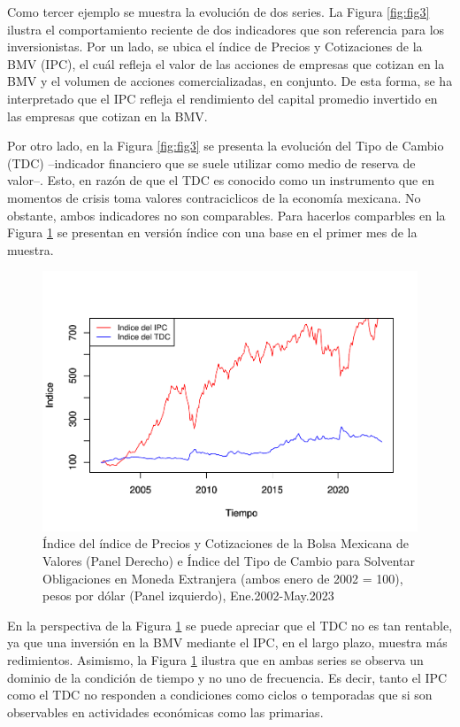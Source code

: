\documentclass[
]{book}
\begin{document}
Como tercer ejemplo se muestra la evolución de dos series. La Figura \ref{fig:fig3} ilustra el comportamiento reciente de dos indicadores que son referencia para los inversionistas. Por un lado, se ubica el índice de Precios y Cotizaciones de la BMV (IPC), el cuál refleja el valor de las acciones de empresas que cotizan en la BMV y el volumen de acciones comercializadas, en conjunto. De esta forma, se ha interpretado que el IPC refleja el rendimiento del capital promedio invertido en las empresas que cotizan en la BMV.

Por otro lado, en la Figura \ref{fig:fig3} se presenta la evolución del Tipo de Cambio (TDC) --indicador financiero que se suele utilizar como medio de reserva de valor--. Esto, en razón de que el TDC es conocido como un instrumento que en momentos de crisis toma valores contraciclicos de la economía mexicana. No obstante, ambos indicadores no son comparables. Para hacerlos comparbles en la Figura \ref{fig:fig4} se presentan en versión índice con una base en el primer mes de la muestra.

\begin{figure}

{\centering \includegraphics{bookdown-demo_files/figure-latex/fig4-1} 

}

\caption{Índice del índice de Precios y Cotizaciones de la Bolsa Mexicana de Valores (Panel Derecho) e Índice del Tipo de Cambio para Solventar Obligaciones en Moneda Extranjera (ambos enero de 2002 = 100), pesos por dólar (Panel izquierdo), Ene.2002-May.2023 }\label{fig:fig4}
\end{figure}

En la perspectiva de la Figura \ref{fig:fig4} se puede apreciar que el TDC no es tan rentable, ya que una inversión en la BMV mediante el IPC, en el largo plazo, muestra más redimientos. Asimismo, la Figura \ref{fig:fig4} ilustra que en ambas series se observa un dominio de la condición de tiempo y no uno de frecuencia. Es decir, tanto el IPC como el TDC no responden a condiciones como ciclos o temporadas que si son observables en actividades económicas como las
primarias.
\end{document}
